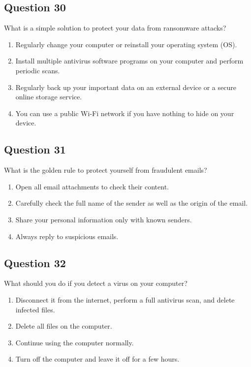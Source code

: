 \documentclass[12pt,a4paper]{article}
\begin{document}
\bigskip


\subsection*{Question 30}
What is a simple solution to protect your data from ransomware attacks?

\begin{enumerate}[label=\Alph*., leftmargin=*]
\item Regularly change your computer or reinstall your operating system (OS).
\item Install multiple antivirus software programs on your computer and perform periodic scans.
\item Regularly back up your important data on an external device or a secure online storage service.
\item You can use a public Wi-Fi network if you have nothing to hide on your device.
\end{enumerate}

\bigskip


\subsection*{Question 31}
What is the golden rule to protect yourself from fraudulent emails?

\begin{enumerate}[label=\Alph*., leftmargin=*]
\item Open all email attachments to check their content.
\item Carefully check the full name of the sender as well as the origin of the email.
\item Share your personal information only with known senders.
\item Always reply to suspicious emails.
\end{enumerate}

\bigskip


\subsection*{Question 32}
What should you do if you detect a virus on your computer?

\begin{enumerate}[label=\Alph*., leftmargin=*]
\item Disconnect it from the internet, perform a full antivirus scan, and delete infected files.
\item Delete all files on the computer.
\item Continue using the computer normally.
\item Turn off the computer and leave it off for a few hours.
\end{enumerate}
\end{document}
